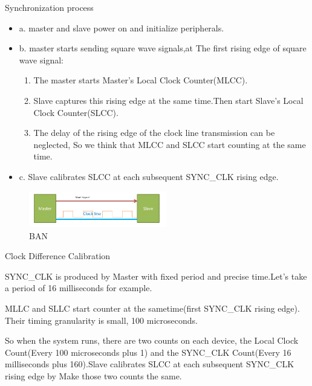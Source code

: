\begin{frame}[fragile]{Synchronization process}

\begin{itemize}
\item a. master and slave power on and initialize peripherals.
\item b. master starts sending square wave signals,at The first rising edge of
square wave signal:
  \begin{enumerate}
    \item  The master starts Master's Local Clock Counter(MLCC).
    \item Slave captures this rising edge at the same time.Then start Slave's Local Clock Counter(SLCC).
    \item The delay of the rising edge of the clock line transmission can be neglected, So we think that MLCC and SLCC start counting at the same time.
  \end{enumerate}
 \item c. Slave calibrates SLCC at each subsequent SYNC\_CLK rising edge.

\end{itemize}



\begin{figure}[htbp]
\begin{center}
\includegraphics[width=6cm]{img/abstim}
\caption{BAN }
\label{Overview}
\end{center}
\vspace{-0.5em}
\end{figure}
\end{frame}





\begin{frame}[fragile]{Clock Difference Calibration}

SYNC\_CLK is produced by Master with fixed period and precise time.Let's take a period of 16 milliseconds for example.

MLLC and SLLC start counter at the sametime(first SYNC\_CLK rising edge). Their timing granularity is small, 100 microseconds.

So when the system runs, there are two counts on each device, the Local Clock Count(Every 100 microseconds plus 1) and the SYNC\_CLK Count(Every 16 milliseconds plus 160).Slave calibrates SLCC at each subsequent SYNC\_CLK rising edge by Make those two counts the same.



\end{frame}




